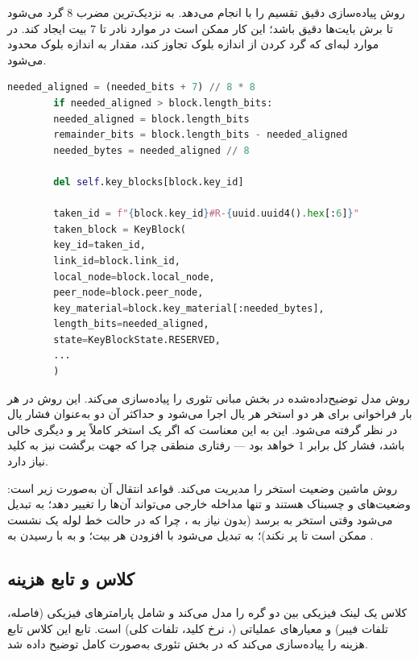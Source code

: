 روش  پیاده‌سازی دقیق تقسیم را با  انجام می‌دهد.  به نزدیک‌ترین مضرب $8$ گرد می‌شود تا برش بایت‌ها دقیق باشد؛ این کار ممکن است در موارد نادر تا $7$ بیت  ایجاد کند. در موارد لبه‌ای که گرد کردن از اندازه بلوک تجاوز کند، مقدار به اندازه بلوک محدود می‌شود.

\begin{LTR}
	\begin{lstlisting}[language=Python]
		needed_aligned = (needed_bits + 7) // 8 * 8
		if needed_aligned > block.length_bits:
		needed_aligned = block.length_bits
		remainder_bits = block.length_bits - needed_aligned
		needed_bytes = needed_aligned // 8
		
		del self.key_blocks[block.key_id]
		
		taken_id = f"{block.key_id}#R-{uuid.uuid4().hex[:6]}"
		taken_block = KeyBlock(
		key_id=taken_id,
		link_id=block.link_id,
		local_node=block.local_node,
		peer_node=block.peer_node,
		key_material=block.key_material[:needed_bytes],
		length_bits=needed_aligned,
		state=KeyBlockState.RESERVED,
		...
		)
	\end{lstlisting}
\end{LTR}

روش  مدل  توضیح‌داده‌شده در بخش مبانی تئوری را پیاده‌سازی می‌کند. این روش در هر بار فراخوانی  برای هر دو استخر هر یال اجرا می‌شود و حداکثر آن دو به‌عنوان فشار یال در نظر گرفته می‌شود. این به این معناست که اگر یک استخر کاملاً پر و دیگری خالی باشد، فشار کل برابر $1$ خواهد بود — رفتاری منطقی چرا که جهت برگشت نیز به کلید نیاز دارد.

روش  ماشین وضعیت استخر را مدیریت می‌کند. قواعد انتقال آن به‌صورت زیر است: وضعیت‌های  و  چسبناک هستند و تنها مداخله خارجی می‌تواند آن‌ها را تغییر دهد؛  به  تبدیل می‌شود وقتی استخر به  برسد (بدون نیاز به ، چرا که در حالت خط لوله یک نشست ممکن است تا  پر نکند)؛  به  تبدیل می‌شود با افزودن هر بیت؛ و  به  با رسیدن به .

\subsection{کلاس  و تابع هزینه}

کلاس  یک لینک فیزیکی بین دو گره را مدل می‌کند و شامل پارامترهای فیزیکی (فاصله، تلفات فیبر) و معیارهای عملیاتی (، نرخ کلید، تلفات کلی) است. تابع  این کلاس تابع هزینه  را پیاده‌سازی می‌کند که در بخش تئوری به‌صورت کامل توضیح داده شد.

